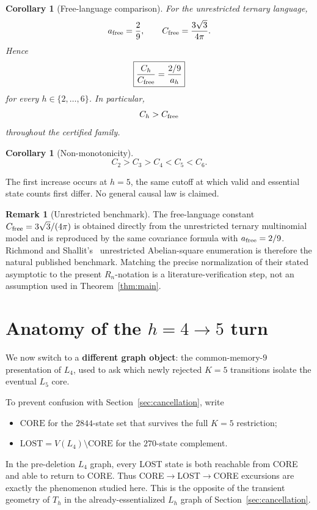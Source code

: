 \documentclass[12pt]{article}
\newtheorem{corollary}[theorem]{Corollary}
\theoremstyle{definition}
\newtheorem{remark}[theorem]{Remark}
\begin{document}
\begin{corollary}[Free-language comparison]
\label{cor:free}
For the unrestricted ternary language,
\[
a_{\rm free}=\frac29,
\qquad
C_{\rm free}=\frac{3\sqrt3}{4\pi}.
\]
Hence
\[
\boxed{
\frac{C_h}{C_{\rm free}}
=
\frac{2/9}{a_h}
}
\]
for every \(h\in\{2,\ldots,6\}\). In particular,
\[
C_h>C_{\rm free}
\]
throughout the certified family.
\end{corollary}

\begin{corollary}[Non-monotonicity]
\label{cor:nonmono}
\[
\boxed{
C_2>C_3>C_4<C_5<C_6.
}
\]
\end{corollary}

The first increase occurs at \(h=5\), the same cutoff at which valid and essential state counts first differ. No general causal law is claimed.

\begin{remark}[Unrestricted benchmark]
\label{rem:benchmark}
The free-language constant \(C_{\rm free}=3\sqrt3/(4\pi)\) is obtained directly from the unrestricted ternary multinomial model and is reproduced by the same covariance formula with \(a_{\rm free}=2/9\). Richmond and Shallit's~\cite{Richmond2009} unrestricted Abelian-square enumeration is therefore the natural published benchmark. Matching the precise normalization of their stated asymptotic to the present \(R_n\)-notation is a literature-verification step, not an assumption used in Theorem~\ref{thm:main}.
\end{remark}

\section{Anatomy of the \texorpdfstring{\(h=4\to5\)}{h=4 to 5} turn}
\label{sec:anatomy}

We now switch to a \textbf{different graph object}: the common-memory-\(9\) presentation of \(L_4\), used to ask which newly rejected \(K=5\) transitions isolate the eventual \(L_5\) core.

To prevent confusion with Section~\ref{sec:cancellation}, write
\begin{itemize}
\item \(\mathrm{CORE}\) for the \(2844\)-state set that survives the full \(K=5\) restriction;
\item \(\mathrm{LOST}=V(L_4)\setminus\mathrm{CORE}\) for the \(270\)-state complement.
\end{itemize}

In the pre-deletion \(L_4\) graph, every LOST state is both reachable from CORE and able to return to CORE. Thus CORE\(\to\)LOST\(\to\)CORE excursions are exactly the phenomenon studied here. This is the opposite of the transient geometry of \(T_h\) in the already-essentialized \(L_h\) graph of Section~\ref{sec:cancellation}.
\end{document}

